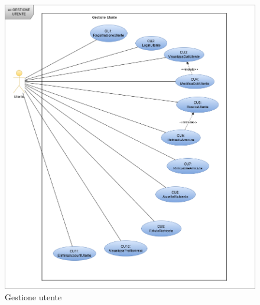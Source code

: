 \documentclass{article}
\begin{document}
\begin{figure}[H]
  \centering
  \includegraphics[width=.8\linewidth]{cu_utente.png}
  \caption{Gestione utente}
  \label{fig:sitemap}
\end{figure}
\end{document}
